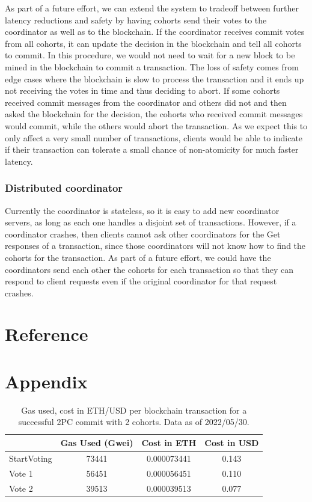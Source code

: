 \documentclass[11pt,conference]{IEEEtran}
\begin{document}
As part of a future effort, we can extend the system to tradeoff between further latency reductions and safety by having cohorts send their votes to the coordinator as well as to the blockchain. If the coordinator receives commit votes from all cohorts, it can update the decision in the blockchain and tell all cohorts to commit. In this procedure, we would not need to wait for a new block to be mined in the blockchain to commit a transaction. The loss of safety comes from edge cases where the blockchain is slow to process the transaction and it ends up not receiving the votes in time and thus deciding to abort. If some cohorts received commit messages from the coordinator and others did not and then asked the blockchain for the decision, the cohorts who received commit messages would commit, while the others would abort the transaction. As we expect this to only affect a very small number of transactions, clients would be able to indicate if their transaction can tolerate a small chance of non-atomicity for much faster latency.

\subsubsection{Distributed coordinator}
Currently the coordinator is stateless, so it is easy to add new coordinator servers, as long as each one handles a disjoint set of transactions. However, if a coordinator crashes, then clients cannot ask other coordinators for the Get responses of a transaction, since those coordinators will not know how to find the cohorts for the transaction. As part of a future effort, we could have the coordinators send each other the cohorts for each transaction so that they can respond to client requests even if the original coordinator for that request crashes.

\section{Reference}


\section{Appendix} \label{appendix}
\begin{table}[hbtp]
     	\centering
     	\caption{Gas used, cost in ETH/USD per blockchain transaction for a successful 2PC commit with 2 cohorts. Data as of 2022/05/30.}
     	\label{table:cost}
     	\begin{tabular}{|l|c|c|c|}
     		\hline
     		  & Gas Used (Gwei) &  Cost in ETH & Cost in USD \\
     		\hline
     		StartVoting &73441 &0.000073441 & 0.143\\
     		\hline
     		Vote 1 &56451	&0.000056451 &0.110\\
     		\hline
     		Vote 2 &39513 &0.000039513 &0.077\\
     		\hline
     	\end{tabular}
     \end{table}
\end{document}
